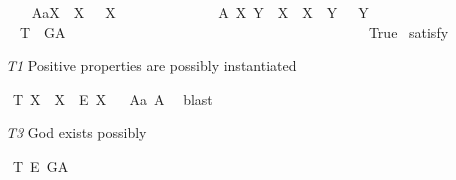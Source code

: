 \begin{isabellebody}
\isamarkuptrue%
\isamarkupfalse%
\ \isanewline
\ \ A{}a{\isacharcolon}{\isachardoublequoteopen}{\isasymlfloor}\isactrlbold {\isasymforall}X{\isachardot}\ {\isasymP}\ {\isacharparenleft}\isactrlbold {\isasymrightharpoondown}X{\isacharparenright}\ \isactrlbold {\isasymrightarrow}\ \isactrlbold {\isasymnot}{\isacharparenleft}{\isasymP}\ X{\isacharparenright}\ {\isasymrfloor}{\isachardoublequoteclose}\ \ \ \ \ \ \ \ \ \ \ %
\isanewline
\ \ A{}{\isacharcolon}\ {\isachardoublequoteopen}{\isasymlfloor}\isactrlbold {\isasymforall}X\ Y{\isachardot}\ {\isacharparenleft}{\isasymP}\ X\ \isactrlbold {\isasymand}\ {\isacharparenleft}X\ {\isasymRrightarrow}\ Y{\isacharparenright}{\isacharparenright}\ \isactrlbold {\isasymrightarrow}\ {\isasymP}\ Y{\isasymrfloor}{\isachardoublequoteclose}\ \ \ \ %
\isanewline
\ \ T{}{\isacharcolon}\ {\isachardoublequoteopen}{\isasymlfloor}{\isasymP}\ G\isactrlsup A{\isasymrfloor}{\isachardoublequoteclose}\ \ \ \ \ \ \ \ \ \ \ \ \ \ \ \ \ \ \ \ \ \ \ \ \ \ \ \ \ \ \ \ \ %
\isanewline
\ \ \ \ \ \ \ \ \isanewline
{}\isamarkupfalse%
\ True\ \isamarkupfalse%
{\isacharbrackleft}satisfy{\isacharbrackright}%
\ %
%
\isamarkupfalse%
\ %
%
%
%
%
\begin{isamarkuptext}%
\emph{T1} Positive properties are possibly instantiated%
\end{isamarkuptext}\isamarkuptrue%
\isamarkupfalse%
\ T{}{\isacharcolon}\ {\isachardoublequoteopen}{\isasymlfloor}\isactrlbold {\isasymforall}X{\isachardot}\ {\isasymP}\ X\ \isactrlbold {\isasymrightarrow}\ \isactrlbold {\isasymdiamond}\isactrlbold {\isasymexists}\isactrlsup E\ X{\isasymrfloor}{\isachardoublequoteclose}%
\ %
%
\isamarkupfalse%
\ A{}a\ A{}\ \isamarkupfalse%
\ blast%
%
%
%
\begin{isamarkuptext}%
\emph{T3} God exists possibly%
\end{isamarkuptext}\isamarkuptrue%
\isamarkupfalse%
\ T{}{\isacharcolon}\ {\isachardoublequoteopen}{\isasymlfloor}\isactrlbold {\isasymdiamond}\isactrlbold {\isasymexists}\isactrlsup E\ G\isactrlsup A{\isasymrfloor}{\isachardoublequoteclose}%
\ %
%
\isamarkupfalse%

\end{isabellebody}
